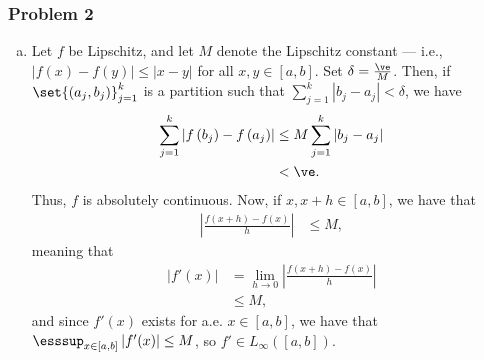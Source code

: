 \documentclass[10pt]{mypackage}
\begin{document}
\subsubsection{Problem 2}%
\begin{enumerate}[(a)]
  \item Let $f$ be Lipschitz, and let $M$ denote the Lipschitz constant --- i.e., $\left\vert f(x)-f(y) \right\vert\leq \left\vert x-y \right\vert$ for all $x,y\in [a,b]$. Set $\delta = \frac{\ve}{M}$. Then, if $\set{\left( a_j,b_j \right)}_{j=1}^{k}$ is a partition such that $\sum_{j=1}^{k}\left\vert b_j-a_j \right\vert < \delta$, we have
    \begin{align*}
      \sum_{j=1}^{k} \left\vert f\left(b_j\right)-f\left( a_j \right) \right\vert &\leq M\sum_{j=1}^{k} \left\vert b_j-a_j \right\vert\\
                                                                                  &< \ve.
    \end{align*}
    Thus, $f$ is absolutely continuous. Now, if $x,x+h\in [a,b]$, we have that
    \begin{align*}
      \left\vert \frac{f\left( x+h \right)-f\left( x \right)}{h} \right\vert &\leq M,
    \end{align*}
    meaning that
    \begin{align*}
      \left\vert f'(x) \right\vert &= \lim_{h\rightarrow 0} \left\vert \frac{f\left( x+h \right)-f(x)}{h} \right\vert\\
                                   &\leq M,
    \end{align*}
    and since $f'(x)$ exists for a.e. $x\in [a,b]$, we have that $\esssup_{x\in [a,b]} \left\vert f'(x) \right\vert \leq M$, so $f'\in L_{\infty}\left( [a,b] \right)$.\newline


\end{enumerate}
\end{document}
